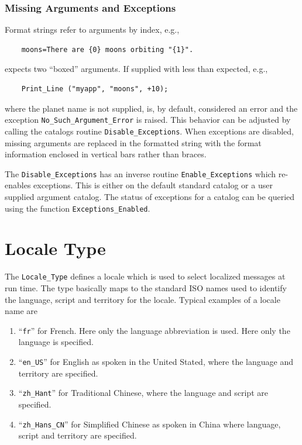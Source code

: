 \subsubsection{Missing Arguments and Exceptions}

Format strings refer to arguments by index, e.g.,
\begin{xmpl}
\begin{verbatim}
    moons=There are {0} moons orbiting "{1}".
\end{verbatim}
\end{xmpl}
expects two ``boxed'' arguments.  If supplied with less than expected, e.g.,
\begin{xmpl}
\begin{verbatim}
    Print_Line ("myapp", "moons", +10);
\end{verbatim}
\end{xmpl}
where the planet name is not supplied, is, by default, considered an error
and the exception \verb|No_Such_Argument_Error| is raised.  This behavior
can be adjusted by calling the catalogs routine \verb|Disable_Exceptions|.
When exceptions are disabled, missing arguments are replaced in the formatted
string with the format information enclosed in vertical bars rather than
braces.

The \verb|Disable_Exceptions| has an inverse routine \verb|Enable_Exceptions|
which re-enables exceptions.  This is either on the default standard catalog
or a user supplied argument catalog.  The status of exceptions for a catalog
can be queried using the function \verb|Exceptions_Enabled|.

\section{Locale Type}

The \texttt{Locale\_Type} defines a locale which is used to select localized
messages at run time.  The type basically maps to the standard ISO names
used to identify the language, script and territory for the locale.  Typical
examples of a locale name are
\begin{enumerate}
\item ``\texttt{fr}'' for French.  Here only the language abbreviation is
      used.  Here only the language is specified.
\item ``\texttt{en\_US}'' for English as spoken in the United Stated, where
      the language and territory are specified.
\item ``\texttt{zh\_Hant}'' for Traditional Chinese, where the language and
      script are specified.
\item ``\texttt{zh\_Hans\_CN}'' for Simplified Chinese as spoken in China
      where language, script and territory are specified.
\end{enumerate}

